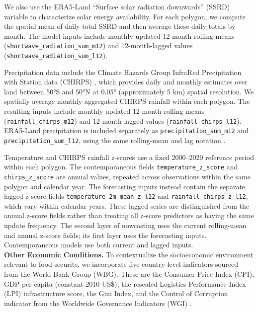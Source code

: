 \documentclass[pdflatex,sn-mathphys-num]{sn-jnl}%
\theoremstyle{thmstyleone}%
\theoremstyle{thmstyletwo}%
\theoremstyle{thmstylethree}%
\begin{document}
We also use the ERA5-Land ``Surface solar radiation downwards'' (SSRD) variable \cite{ECMWF_ERA5Land} to characterize solar energy availability. For each polygon, we compute the spatial mean of daily total SSRD and then average these daily totals by month. The model inputs include monthly updated 12-month rolling means (\texttt{shortwave\_radiation\_sum\_m12}) and 12-month-lagged values (\texttt{shortwave\_radiation\_sum\_l12}).

Precipitation data include the Climate Hazards Group InfraRed Precipitation with Station data (CHIRPS) \cite{Funk_CHIRPS_2015}, which provides daily and monthly estimates over land between 50°S and 50°N at 0.05° (approximately 5 km) spatial resolution. We spatially average monthly-aggregated CHIRPS rainfall within each polygon. The resulting inputs include monthly updated 12-month rolling means (\texttt{rainfall\_chirps\_m12}) and 12-month-lagged values (\texttt{rainfall\_chirps\_l12}). ERA5-Land precipitation is included separately as \texttt{precipitation\_sum\_m12} and \texttt{precipitation\_sum\_l12}, using the same rolling-mean and lag notation \cite{ECMWF_ERA5Land}.

Temperature and CHIRPS rainfall z-scores use a fixed 2000--2020 reference period within each polygon. The contemporaneous fields \texttt{temperature\_z\_score} and \texttt{chirps\_z\_score} are annual values, repeated across observations within the same polygon and calendar year. The forecasting inputs instead contain the separate lagged z-score fields \texttt{temperature\_2m\_mean\_z\_l12} and \texttt{rainfall\_chirps\_z\_l12}, which vary within calendar years. These lagged series are distinguished from the annual z-score fields rather than treating all z-score predictors as having the same update frequency. The second layer of nowcasting uses the current rolling-mean and annual z-score fields; its first layer uses the forecasting inputs. Contemporaneous models use both current and lagged inputs.\\

\noindent\textbf{Other Economic Conditions.}
To contextualize the socioeconomic environment relevant to food security, we incorporate five country-level indicators sourced from the World Bank Group (WBG). These are the Consumer Price Index (CPI), GDP per capita (constant 2010 US\$), the rescaled Logistics Performance Index (LPI) infrastructure score, the Gini Index, and the Control of Corruption indicator from the Worldwide Governance Indicators (WGI) \cite{WB_CPI_2024, WB_Infrastructure_2024}.
\end{document}

